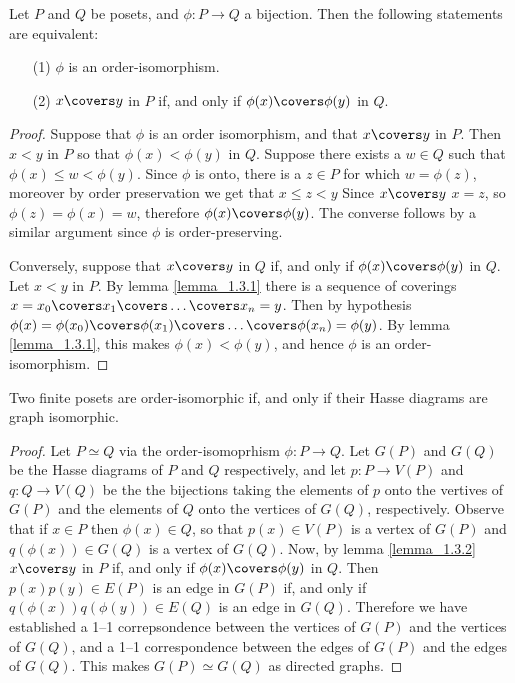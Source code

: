 \begin{lemma}\label{lemma_1.3.2}
  Let $P$ and $Q$ be posets, and $\phi:P \xrightarrow{} Q$ a
  bijection. Then the following statements are equivalent:
  \begin{enumerate}
    \item[(1)] $\phi$ is an order-isomorphism.

    \item[(2)] $x \covers y$ in $P$ if, and only if $\phi(x) \covers
      \phi(y)$ in $Q$.
  \end{enumerate}
\end{lemma}
\begin{proof}
  Suppose that $\phi$ is an order isomorphism, and that $x \covers y$
  in $P$. Then $x<y$ in $P$ so that  $\phi(x)<\phi(y)$ in $Q$. Suppose
  there exists a $w \in Q$ such that $\phi(x) \leq w<\phi(y)$.
  Since $\phi$ is onto, there is a $z \in P$ for
  which $w=\phi(z)$, moreover by order preservation we get that $x
  \leq z<y$ Since $x \covers y$ $x=z$, so $\phi(z)=\phi(x)=w$,
  therefore $\phi(x) \covers \phi(y)$. The converse follows by a
  similar argument since $\phi$ is order-preserving.

  Conversely, suppose that $x \covers y$ in  $Q$ if, and only if
  $\phi(x) \covers \phi(y)$ in $Q$. Let $x<y$ in $P$. By lemma
  \ref{lemma_1.3.1} there is a sequence of coverings $x=x_0 \covers
  x_1 \covers \dots \covers x_n=y$. Then by hypothesis
  $\phi(x)=\phi(x_0) \covers \phi(x_1) \covers \dots \covers
  \phi(x_n)=\phi(y)$. By lemma \ref{lemma_1.3.1}, this makes
  $\phi(x)<\phi(y)$, and hence $\phi$ is an order-isomorphism.
\end{proof}

\begin{proposition}\label{proposition_1.3.3}
  Two finite posets are order-isomorphic if, and only if their Hasse
  diagrams are graph isomorphic.
\end{proposition}
\begin{proof}
  Let $P \simeq Q$ via the order-isomoprhism  $\phi:P \xrightarrow{}
  Q$. Let $G(P)$ and $G(Q)$ be the Hasse diagrams of $P$ and $Q$
  respectively, and let $p:P \xrightarrow{} V(P)$ and $q:Q
  \xrightarrow{} V(Q)$ be the the bijections taking the elements of
  $p$ onto the vertives of $G(P)$ and the elements of $Q$ onto the
  vertices of $G(Q)$, respectively. Observe that if $x \in P$ then
  $\phi(x) \in Q$, so that $p(x) \in V(P)$ is a vertex of $G(P)$ and
  $q(\phi(x)) \in G(Q)$ is a vertex of $G(Q)$. Now, by lemma
  \ref{lemma_1.3.2} $x \covers y$ in $P$ if, and only if $\phi(x)
  \covers \phi(y)$ in $Q$. Then $p(x)p(y) \in E(P)$ is an edge in
  $G(P)$ if, and only if $q(\phi(x))q(\phi(y)) \in E(Q)$ is an edge in
  $G(Q)$. Therefore we have established a 1--1 correpsondence between
  the vertices of $G(P)$ and the vertices of $G(Q)$, and a 1--1
  correspondence between the edges of $G(P)$ and the edges of $G(Q)$.
  This makes $G(P) \simeq G(Q)$ as directed graphs.
\end{proof}

